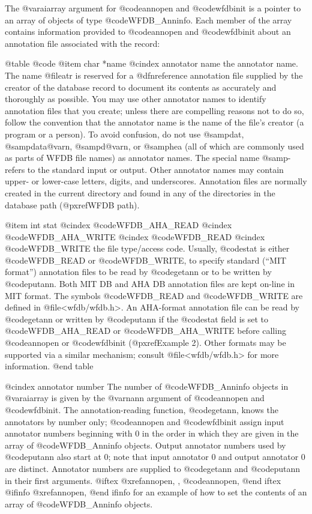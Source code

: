 {{{{{{{{{{The @var{aiarray} argument for @code{annopen} and @code{wfdbinit} is a
pointer to an array of objects of type @code{WFDB_Anninfo}.  Each member
of the array contains information provided to @code{annopen} and
@code{wfdbinit} about an annotation file associated with the
record:

@table @code
@item char *name
@cindex annotator name
the annotator name.  The name @file{atr} is reserved for a @dfn{reference
annotation file} supplied by the creator of the database record to document its
contents as accurately and thoroughly as possible.  You may use other annotator
names to identify annotation files that you create; unless there are compelling
reasons not to do so, follow the convention that the annotator name is the name
of the file's creator (a program or a person).  To avoid confusion, do not use
@samp{dat}, @samp{data@var{n}}, @samp{d@var{n}}, or @samp{hea}
(all of which are commonly used as parts of WFDB file names) as annotator
names.  The special name @samp{-} refers to the standard input or output.
Other annotator names may contain upper- or lower-case letters, digits, and
underscores.  Annotation files are normally created in the current directory
and found in any of the directories in the database path (@pxref{WFDB path}).

@item int stat
@cindex @code{WFDB_AHA_READ}
@cindex @code{WFDB_AHA_WRITE}
@cindex @code{WFDB_READ}
@cindex @code{WFDB_WRITE}
the file type/access code.  Usually, @code{stat} is either @code{WFDB_READ}
or @code{WFDB_WRITE}, to specify standard (``MIT format'') annotation files
to be read by @code{getann} or to be written by @code{putann}.  Both MIT
DB and AHA DB annotation files are kept on-line in MIT format.  The
symbols @code{WFDB_READ} and @code{WFDB_WRITE} are defined in
@file{<wfdb/wfdb.h>}. An AHA-format annotation file can be read by
@code{getann} or written by @code{putann} if the @code{stat} field is
set to @code{WFDB_AHA_READ} or @code{WFDB_AHA_WRITE} before calling
@code{annopen} or @code{wfdbinit} (@pxref{Example 2}).  Other formats
may be supported via a similar mechanism; consult @file{<wfdb/wfdb.h>}
for more information.
@end table

@cindex annotator number
The number of @code{WFDB_Anninfo} objects in @var{aiarray} is given by
the @var{nann} argument of @code{annopen} and @code{wfdbinit}.  The
annotation-reading function, @code{getann}, knows the annotators by
number only; @code{annopen} and @code{wfdbinit} assign input annotator
numbers beginning with 0 in the order in which they are given in the
array of @code{WFDB_Anninfo} objects.  Output annotator numbers used by
@code{putann} also start at 0; note that input annotator 0 and output
annotator 0 are distinct.  Annotator numbers are supplied to
@code{getann} and @code{putann} in their first arguments.
@iftex
@xref{annopen, , @code{annopen}},
@end iftex
@ifinfo
@xref{annopen},
@end ifinfo
for an example of how to set the contents of an array of @code{WFDB_Anninfo}
objects.

}}}}}}}}}}
